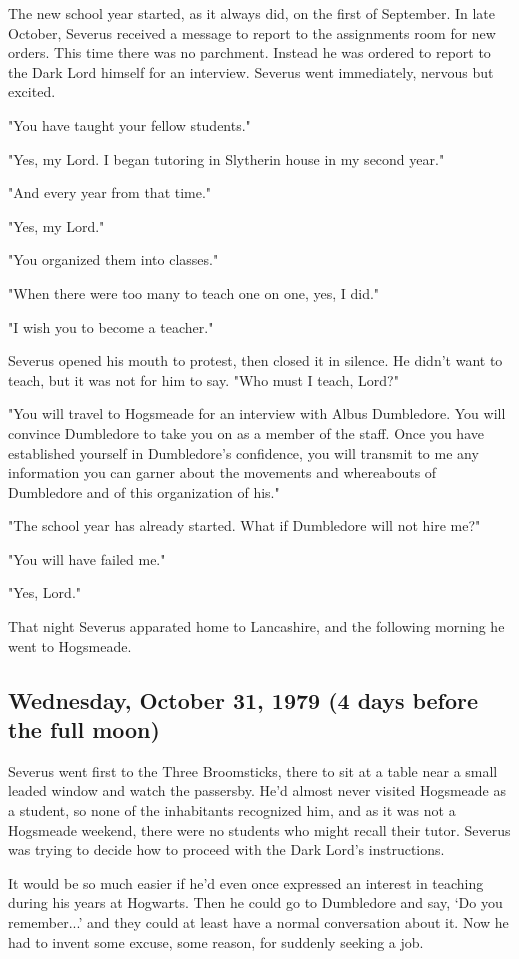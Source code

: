 \documentclass[a4paper,11pt]{article}
\begin{document}
The new school year started, as it always did, on the first of September. In late October, Severus received a message to report to the assignments room for new orders. This time there was no parchment. Instead he was ordered to report to the Dark Lord himself for an interview. Severus went immediately, nervous but excited.

"You have taught your fellow students."

"Yes, my Lord. I began tutoring in Slytherin house in my second year."

"And every year from that time."

"Yes, my Lord."

"You organized them into classes."

"When there were too many to teach one on one, yes, I did."

"I wish you to become a teacher."

Severus opened his mouth to protest, then closed it in silence. He didn't want to teach, but it was not for him to say. "Who must I teach, Lord?"

"You will travel to Hogsmeade for an interview with Albus Dumbledore. You will convince Dumbledore to take you on as a member of the staff. Once you have established yourself in Dumbledore's confidence, you will transmit to me any information you can garner about the movements and whereabouts of Dumbledore and of this organization of his."

"The school year has already started. What if Dumbledore will not hire me?"

"You will have failed me."

"Yes, Lord."

That night Severus apparated home to Lancashire, and the following morning he went to Hogsmeade.

\subsection{Wednesday, October 31, 1979 (4 days before the full moon)}

Severus went first to the Three Broomsticks, there to sit at a table near a small leaded window and watch the passersby. He'd almost never visited Hogsmeade as a student, so none of the inhabitants recognized him, and as it was not a Hogsmeade weekend, there were no students who might recall their tutor. Severus was trying to decide how to proceed with the Dark Lord's instructions.

It would be so much easier if he'd even once expressed an interest in teaching during his years at Hogwarts. Then he could go to Dumbledore and say, `Do you remember...' and they could at least have a normal conversation about it. Now he had to invent some excuse, some reason, for suddenly seeking a job.
\end{document}
